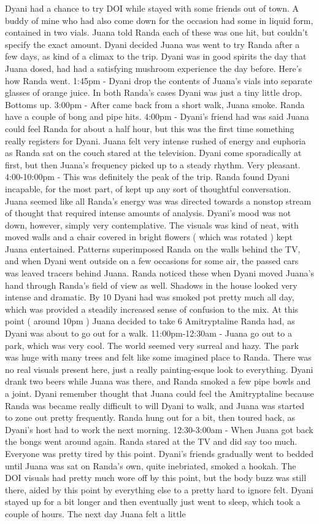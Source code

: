 \documentclass[12pt]{book}
\begin{document}
Dyani had a chance to try DOI while stayed with some friends out of town. A buddy of mine who had also come down for the occasion had some in liquid form, contained in two vials. Juana told Randa each of these was one hit, but couldn't specify the exact amount. Dyani decided Juana was went to try Randa after a few days, as kind of a climax to the trip. Dyani was in good spirits the day that Juana dosed, had had a satisfying mushroom experience the day before. Here's how Randa went. 1:45pm - Dyani drop the contents of Juana's vials into separate glasses of orange juice. In both Randa's cases Dyani was just a tiny little drop. Bottoms up. 3:00pm - After came back from a short walk, Juana smoke. Randa have a couple of bong and pipe hits. 4:00pm - Dyani's friend had was said Juana could feel Randa for about a half hour, but this was the first time something really registers for Dyani. Juana felt very intense rushed of energy and euphoria as Randa sat on the couch stared at the television. Dyani come sporadically at first, but then Juana's frequency picked up to a steady rhythm. Very pleasant. 4:00-10:00pm - This was definitely the peak of the trip. Randa found Dyani incapable, for the most part, of kept up any sort of thoughtful conversation. Juana seemed like all Randa's energy was was directed towards a nonstop stream of thought that required intense amounts of analysis. Dyani's mood was not down, however, simply very contemplative. The visuals was kind of neat, with moved walls and a chair covered in bright flowers ( which was rotated ) kept Juana entertained. Patterns superimposed Randa on the walls behind the TV, and when Dyani went outside on a few occasions for some air, the passed cars was leaved tracers behind Juana. Randa noticed these when Dyani moved Juana's hand through Randa's field of view as well. Shadows in the house looked very intense and dramatic. By 10 Dyani had was smoked pot pretty much all day, which was provided a steadily increased sense of confusion to the mix. At this point ( around 10pm ) Juana decided to take 6 Amitryptaline Randa had, as Dyani was about to go out for a walk. 11:00pm-12:30am - Juana go out to a park, which was very cool. The world seemed very surreal and hazy. The park was huge with many trees and felt like some imagined place to Randa. There was no real visuals present here, just a really painting-esque look to everything. Dyani drank two beers while Juana was there, and Randa smoked a few pipe bowls and a joint. Dyani remember thought that Juana could feel the Amitryptaline because Randa was became really difficult to will Dyani to walk, and Juana was started to zone out pretty frequently. Randa hung out for a bit, then toured back, as Dyani's host had to work the next morning. 12:30-3:00am - When Juana got back the bongs went around again. Randa stared at the TV and did say too much. Everyone was pretty tired by this point. Dyani's friends gradually went to bedded until Juana was sat on Randa's own, quite inebriated, smoked a hookah. The DOI visuals had pretty much wore off by this point, but the body buzz was still there, aided by this point by everything else to a pretty hard to ignore felt. Dyani stayed up for a bit longer and then eventually just went to sleep, which took a couple of hours. The next day Juana felt a little 
\end{document}
